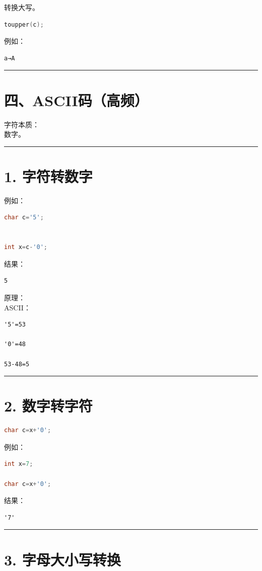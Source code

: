 \documentclass[10pt,twocolumn]{extarticle}
\begin{document}
转换大写。
\begin{lstlisting}[language=C++]
toupper(c);
\end{lstlisting}
例如：
\begin{lstlisting}
a→A
\end{lstlisting}

\noindent\rule{\linewidth}{0.4pt}

\section{四、ASCII码（高频）}

字符本质：\\
数字。

\noindent\rule{\linewidth}{0.4pt}

\section{1. 字符转数字}

例如：
\begin{lstlisting}[language=C++]
char c='5';


int x=c-'0';
\end{lstlisting}
结果：
\begin{lstlisting}
5
\end{lstlisting}
原理：\\
ASCII：
\begin{lstlisting}
'5'=53

'0'=48

53-48=5
\end{lstlisting}

\noindent\rule{\linewidth}{0.4pt}

\section{2. 数字转字符}
\begin{lstlisting}[language=C++]
char c=x+'0';
\end{lstlisting}
例如：
\begin{lstlisting}[language=C++]
int x=7;

char c=x+'0';
\end{lstlisting}
结果：
\begin{lstlisting}
'7'
\end{lstlisting}

\noindent\rule{\linewidth}{0.4pt}

\section{3. 字母大小写转换}
\end{document}
